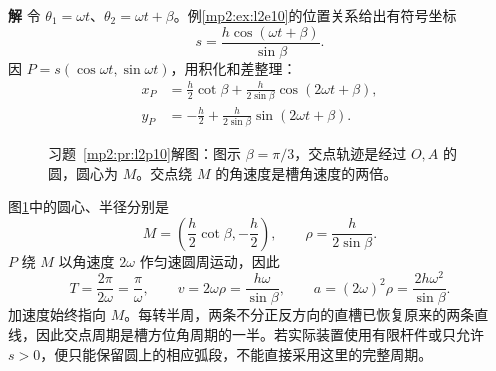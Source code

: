 \documentclass[11pt,openany,fontset=fandol]{ctexbook}
\theoremstyle{definition}\newtheorem{example}{例}[chapter]\newtheorem{exercise}{习题}[chapter]
\newcommand{\SolutionStart}{\par\medskip\ifdim\pagetotal>0pt\ifdim\dimexpr\pagegoal-\pagetotal\relax<3\baselineskip\newpage\fi\fi\noindent\textbf{解}\quad\ignorespaces}
\newenvironment{solution}{\SolutionStart}{\par\medskip}
\begin{document}
\begin{solution}
令 $\theta_1=\omega t$、$\theta_2=\omega t+\beta$。例\ref{mp2:ex:l2e10}的位置关系给出有符号坐标
\[
s=\frac{h\cos(\omega t+\beta)}{\sin\beta}.
\]
因 $P=s(\cos\omega t,\sin\omega t)$，用积化和差整理：
\begin{align*}
x_P&=\frac h2\cot\beta+\frac{h}{2\sin\beta}\cos(2\omega t+\beta),\\
y_P&=-\frac h2+\frac{h}{2\sin\beta}\sin(2\omega t+\beta).
\end{align*}

\begin{figure}[H]\centering
{}
\caption{习题~\ref{mp2:pr:l2p10}解图：图示 $\beta=\pi/3$，交点轨迹是经过 $O,A$ 的圆，圆心为 $M$。交点绕 $M$ 的角速度是槽角速度的两倍。}\label{mp2:fig:l2p10-s}
\end{figure}

图\ref{mp2:fig:l2p10-s}中的圆心、半径分别是
\[
M=\left(\frac h2\cot\beta,-\frac h2\right),\qquad
\rho=\frac{h}{2\sin\beta}.
\]
$P$ 绕 $M$ 以角速度 $2\omega$ 作匀速圆周运动，因此
\[
T=\frac{2\pi}{2\omega}=\frac\pi\omega,\qquad
v=2\omega\rho=\frac{h\omega}{\sin\beta},\qquad
a=(2\omega)^2\rho=\frac{2h\omega^2}{\sin\beta}.
\]
加速度始终指向 $M$。每转半周，两条不分正反方向的直槽已恢复原来的两条直线，因此交点周期是槽方位角周期的一半。若实际装置使用有限杆件或只允许 $s>0$，便只能保留圆上的相应弧段，不能直接采用这里的完整周期。

\end{solution}
\end{document}
